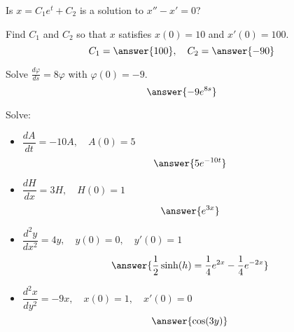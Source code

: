 \documentclass{ximera}
\begin{document}
\begin{exercise}%
    Is $x=C_1e^t+C_2$ is a solution to $x''-x' = 0$?
    \begin{multipleChoice}
    \end{multipleChoice}
    \begin{problem}
        Find $C_1$ and $C_2$ so that $x$ satisfies $x(0) = 10$ and $x'(0) = 100$.
        \[
            C_1 = \answer{100}, \quad C_2 = \answer{-90}
        \]
    \end{problem}
\end{exercise}


\begin{exercise}%
    Solve $\frac{d\varphi}{ds} = 8 \varphi$ with $\varphi(0) = -9$.
    \[
        \answer{-9e^{8s}}
    \]
\end{exercise}

\begin{exercise}
    Solve:
    \begin{itemize}
        \item $\dfrac{dA}{dt} = -10 A, \quad A(0)=5$
            \[
                \answer{5e^{-10t}}
            \]
        \item $\dfrac{dH}{dx} = 3 H, \quad H(0)=1$
            \[
                \answer{e^{3x}}
            \]
        \item $\dfrac{d^2y}{dx^2} = 4 y, \quad y(0)=0, \quad y'(0)=1$
            \[
                \answer{\frac{1}{2}\sinh(h) = \frac{1}{4}e^{2x} - \frac{1}{4}e^{-2x}}%
            \]
        \item $\dfrac{d^2x}{dy^2} = -9 x, \quad x(0)=1, \quad x'(0)=0$
            \[
                \answer{\cos(3y)}
            \]
    \end{itemize}
\end{exercise}
\end{document}
